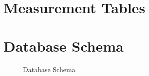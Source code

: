 


    \section{Measurement Tables}\label{app:measures_toolino}
    


    \section{Database Schema}\label{app:database_schema}
        \begin{sidewaysfigure}[htbp]
            \centering
            \caption{Database Schema}
            \label{fig:database_schema}
        \end{sidewaysfigure}


